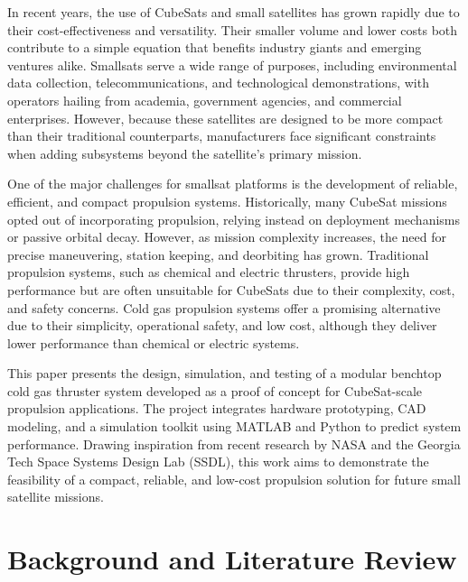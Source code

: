 \documentclass{new-aiaa}
\begin{document}
In recent years, the use of CubeSats and small satellites has grown rapidly due to their cost-effectiveness and versatility. Their smaller volume and lower costs both contribute to a simple equation that benefits industry giants and emerging ventures alike. Smallsats serve a wide range of purposes, including environmental data collection, telecommunications, and technological demonstrations, with operators hailing from academia, government agencies, and commercial enterprises. However, because these satellites are designed to be more compact than their traditional counterparts, manufacturers face significant constraints when adding subsystems beyond the satellite’s primary mission.

One of the major challenges for smallsat platforms is the development of reliable, efficient, and compact propulsion systems. Historically, many CubeSat missions opted out of incorporating propulsion, relying instead on deployment mechanisms or passive orbital decay. However, as mission complexity increases, the need for precise maneuvering, station keeping, and deorbiting has grown. Traditional propulsion systems, such as chemical and electric thrusters, provide high performance but are often unsuitable for CubeSats due to their complexity, cost, and safety concerns. Cold gas propulsion systems offer a promising alternative due to their simplicity, operational safety, and low cost, although they deliver lower performance than chemical or electric systems.

This paper presents the design, simulation, and testing of a modular benchtop cold gas thruster system developed as a proof of concept for CubeSat-scale propulsion applications. The project integrates hardware prototyping, CAD modeling, and a simulation toolkit using MATLAB and Python to predict system performance. Drawing inspiration from recent research by NASA and the Georgia Tech Space Systems Design Lab (SSDL), this work aims to demonstrate the feasibility of a compact, reliable, and low-cost propulsion solution for future small satellite missions.


\section{Background and Literature Review}
\end{document}
